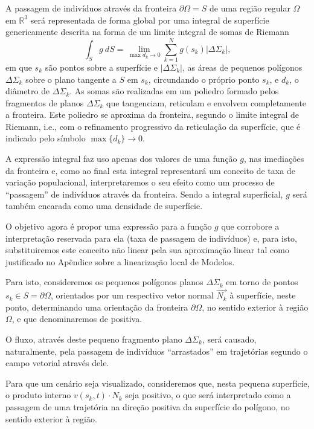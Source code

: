 A passagem de indivíduos através da fronteira \(\partial \Omega = S\) de uma região regular \(\Omega\) em \(\mathbb{R}^3\) será representada de forma global por uma integral de superfície genericamente descrita na forma de um limite integral de somas de Riemann
\[\displaystyle\int_{S} g\ dS = \lim_{\max{d_k} \to 0} \sum_{k=1}^N g(s_k) |\Delta \Sigma_k|,\]
em que \(s_k\) são pontos sobre a superfície e \(|\Delta \Sigma_k|\), as áreas de pequenos polígonos \(\Delta \Sigma_k\) sobre o plano tangente a \(S\) em \(s_k\), circundando o próprio ponto \(s_k\), e \(d_k\), o diâmetro de \(\Delta \Sigma_k\). As somas são realizadas em um poliedro formado pelos fragmentos de planos \(\Delta \Sigma_k\) que tangenciam, reticulam e envolvem completamente a fronteira. Este poliedro se aproxima da fronteira, segundo o limite integral de Riemann, i.e., com o refinamento progressivo da reticulação da superfície, que é indicado pelo símbolo \(\max\{d_k\} \to 0\).

A expressão integral faz uso apenas dos valores de uma função \(g\), nas imediações da fronteira e, como ao final esta integral representará um conceito de taxa de variação populacional, interpretaremos o seu efeito como um processo de ``passagem'' de indivíduos através da fronteira. Sendo a integral superficial, \(g\) será também encarada como uma densidade de superfície.

O objetivo agora é propor uma expressão para a função \(g\) que corrobore a interpretação reservada para ela (taxa de passagem de indivíduos) e, para isto, substituiremos este conceito não linear pela sua aproximação linear tal como justificado no Apêndice sobre a linearização local de Modelos.

Para isto, consideremos os pequenos polígonos planos \(\Delta \Sigma_k\) em torno de pontos \(s_k \in S = \partial \Omega\), orientados por um respectivo vetor normal \(\vec{N_k}\) à superfície, neste ponto, determinando uma orientação da fronteira \(\partial \Omega\), no sentido exterior à região \(\Omega\), e que denominaremos de positiva.

O fluxo, através deste pequeno fragmento plano \(\Delta \Sigma_k\), será causado, naturalmente, pela passagem de indivíduos ``arrastados'' em trajetórias segundo o campo vetorial através dele.

Para que um cenário seja visualizado, consideremos que, nesta pequena superfície, o produto interno \(v(s_k, t) \cdot N_k\) seja positivo, o que será interpretado como a passagem de uma trajetória na direção positiva da superfície do polígono, no sentido exterior à região.

